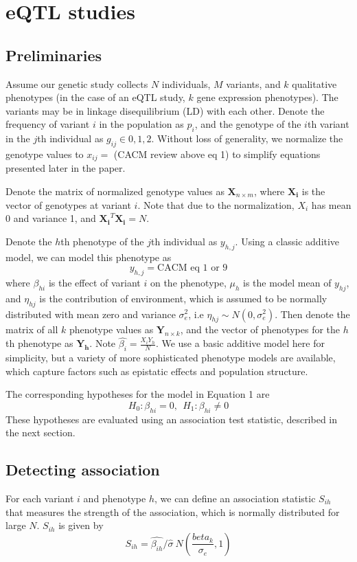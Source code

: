 \documentclass{article}
\newcommand{\mb}[1]{\mathbf{#1}}
\begin{document}
	
\section{eQTL studies}
\subsection{Preliminaries}
Assume our genetic study collects $N$ individuals, $M$ variants, and $k$ qualitative phenotypes (in the case of an eQTL study, $k$ gene expression phenotypes). The variants may be in linkage disequilibrium (LD) with each other. Denote the frequency of variant $i$ in the population as $p_i$, and the genotype of the $i$th variant in the $j$th individual as $g_{ij} \in {0,1,2}$. Without loss of generality, we normalize the genotype values to $x_{ij} =$ (CACM review above eq 1) to simplify equations presented later in the paper.

Denote the matrix of normalized genotype values as $\mb{X}_{n \times m}$, where $\mb{X_i}$ is the vector of genotypes at variant $i$. Note that due to the normalization, $X_i$ has mean 0 and variance 1, and $\mb{X_i}^T \mb{X_i} = N$.

Denote the $h$th phenotype of the $j$th individual as $y_{h,j}$. Using a classic additive model, we can model this phenotype as 
\[ y_{h,j} = \text{CACM eq 1 or 9}\] 
where $\beta_{hi}$ is the effect of variant $i$ on the phenotype, $\mu_h$ is the model mean of $y_{hj}$, and $\eta_{hj}$ is the contribution of environment, which is assumed to be normally distributed with mean zero and variance $\sigma_e^2$, i.e $\eta_{hj} \sim N(0,\sigma_e^2)$. Then denote the matrix of all $k$ phenotype values as $\mb{Y}_{n \times k}$, and the vector of phenotypes for the $h$th phenotype as $\mb{Y_h}$. Note $\hat{\beta_i}  = \frac{X_i Y_h}{N}$. We use a basic additive model here for simplicity, but a variety of more sophisticated phenotype models are available, which capture factors such as epistatic effects and population structure.

The corresponding hypotheses for the model in Equation 1 are
\[H_0: \beta_{hi} = 0, \ \ H_1: \beta_{hi} \not= 0\]
These hypotheses are evaluated using an association test statistic, described in the next section.

\subsection{Detecting association}
For each variant $i$ and phenotype $h$, we can define an association statistic $S_{ih}$ that measures the strength of the association, which is normally distributed for large $N$. $S_{ih}$ is given by
\[S_{ih} = \hat{\beta_{ih}}/\hat{\sigma} 
~ N(\frac{beta_k}{\sigma_{e}}, 1)\]
\end{document}
